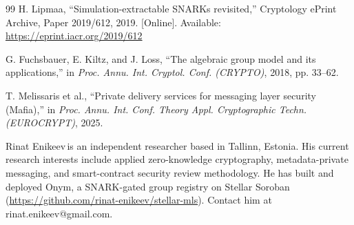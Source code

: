 \documentclass{IEEEcsmag}
\begin{document}
\begin{thebibliography}{99}
H. Lipmaa, ``Simulation-extractable SNARKs revisited,'' Cryptology ePrint Archive, Paper 2019/612, 2019. [Online]. Available: \url{https://eprint.iacr.org/2019/612}

G. Fuchsbauer, E. Kiltz, and J. Loss, ``The algebraic group model and its applications,'' in \emph{Proc. Annu. Int. Cryptol. Conf. (CRYPTO)}, 2018, pp. 33--62.

T. Melissaris et al., ``Private delivery services for messaging layer security (Mafia),'' in \emph{Proc. Annu. Int. Conf. Theory Appl. Cryptographic Techn. (EUROCRYPT)}, 2025.

\end{thebibliography}\vspace*{-8pt}


%
\begin{IEEEbiography}{Rinat Enikeev}{\,}is an independent researcher based in Tallinn, Estonia. His current research interests include applied zero-knowledge cryptography, metadata-private messaging, and smart-contract security review methodology. He has built and deployed Onym, a SNARK-gated group registry on Stellar Soroban (\url{https://github.com/rinat-enikeev/stellar-mls}). Contact him at rinat.enikeev@gmail.com.
\end{IEEEbiography}
\end{document}

